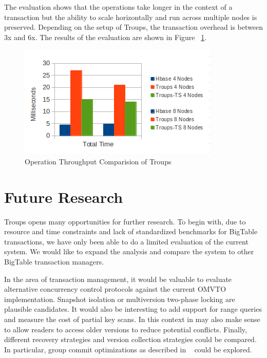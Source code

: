 \documentclass[10pt,final,journal]{IEEEtran}
\begin{document}
The evaluation shows that the operations take longer in the context of a transaction but the ability to scale horizontally and run across multiple nodes is preserved.  Depending on the setup of Troups, the transaction overhead is between 3x and 6x.  The results of the evaluation are shown in Figure ~\ref{tp}. 

\begin{figure}[h]
\centering
\hspace*{-.2in}
\includegraphics[scale=0.7]{images/throughput.png}
\caption{Operation Throughput Comparision of Troups}
\label{tp}
\end{figure}

\section{Future Research}
Troups opens many opportunities for further research. To begin with, due to resource and time constraints and lack of standardized benchmarks for BigTable transactions, we have only been able to do a limited evaluation of the current system. We would like to expand the analysis and compare the system to other BigTable transaction managers.

In the area of transaction management, it would be valuable to evaluate alternative concurrency control protocols against the current OMVTO implementation. Snapshot isolation or multiversion two-phase locking are plausible candidates. It would also be interesting to add support for range queries and measure the cost of partial key scans. In this context in may also make sense to allow readers to access older versions to reduce potential conflicts. Finally, different recovery strategies and version collection strategies could be compared. In particular, group commit optimizations as described in ~\cite{Weikum:2001:TIS} could be explored.
\end{document}
